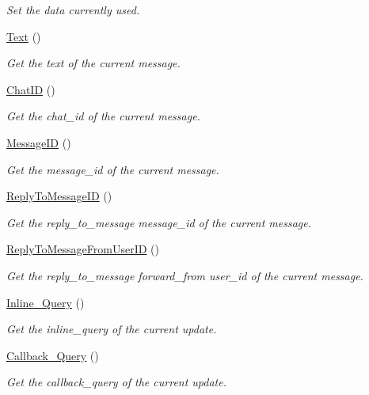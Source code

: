 \begin{DoxyCompactItemize}
\begin{DoxyCompactList}\small\item\em Set the data currently used. \end{DoxyCompactList}\item 
\hyperlink{class_telegram_a950a98ae75562dc9c6a458acbd330143}{Text} ()
\begin{DoxyCompactList}\small\item\em Get the text of the current message. \end{DoxyCompactList}\item 
\hyperlink{class_telegram_a4b624bab3560ed1e761aba1e7431cb6e}{Chat\+I\+D} ()
\begin{DoxyCompactList}\small\item\em Get the chat\+\_\+id of the current message. \end{DoxyCompactList}\item 
\hyperlink{class_telegram_a957f0d35d7a8cabb6116cc7bf51ceac2}{Message\+I\+D} ()
\begin{DoxyCompactList}\small\item\em Get the message\+\_\+id of the current message. \end{DoxyCompactList}\item 
\hyperlink{class_telegram_ad4dbc2a3a269f1e596a3d6b40c948ebf}{Reply\+To\+Message\+I\+D} ()
\begin{DoxyCompactList}\small\item\em Get the reply\+\_\+to\+\_\+message message\+\_\+id of the current message. \end{DoxyCompactList}\item 
\hyperlink{class_telegram_afd21e142f6ae005b8f72b39624da3505}{Reply\+To\+Message\+From\+User\+I\+D} ()
\begin{DoxyCompactList}\small\item\em Get the reply\+\_\+to\+\_\+message forward\+\_\+from user\+\_\+id of the current message. \end{DoxyCompactList}\item 
\hyperlink{class_telegram_a27937704e98b35ccaf2066aa74b1fbe1}{Inline\+\_\+\+Query} ()
\begin{DoxyCompactList}\small\item\em Get the inline\+\_\+query of the current update. \end{DoxyCompactList}\item 
\hyperlink{class_telegram_a891f961aa0d3272c01ac9fe64f10a714}{Callback\+\_\+\+Query} ()
\begin{DoxyCompactList}\small\item\em Get the callback\+\_\+query of the current update. \end{DoxyCompactList}\item 

\end{DoxyCompactItemize}

